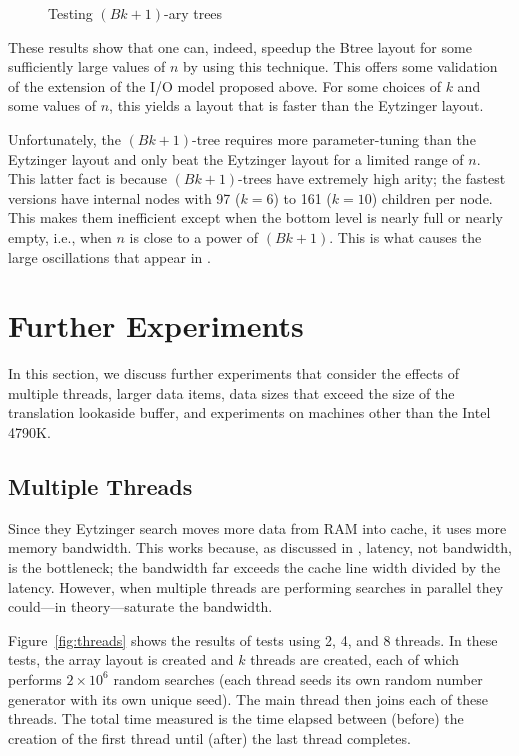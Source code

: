 \documentclass{patmorin}
\begin{document}
\begin{figure}
   \caption{Testing $(Bk+1)$-ary trees}
\end{figure}

These results show that one can, indeed, speedup the Btree layout for
some sufficiently large values of $n$ by using this technique.  This offers
some validation of the extension of the I/O model proposed above.
For some choices of $k$ and some values of $n$, this yields a layout
that is faster than the Eytzinger layout. 

Unfortunately, the $(Bk+1)$-tree requires more parameter-tuning than the
Eytzinger layout and only beat the Eytzinger layout for a limited range
of $n$.  This latter fact is because $(Bk+1)$-trees have extremely high
arity; the fastest versions have internal nodes with 97 ($k=6$) to 161
($k=10$) children per node. This makes them inefficient except when the
bottom level is nearly full or nearly empty, i.e., when $n$ is close to
a power of $(Bk+1)$.  This is what causes the large oscillations that
appear in .

\section{Further Experiments}

In this section, we discuss further experiments that consider the effects
of multiple threads, larger data items, data sizes that exceed the size
of the translation lookaside buffer, and experiments on machines other
than the Intel 4790K.

\subsection{Multiple Threads}

Since they Eytzinger search moves more data from RAM into cache,
it uses more memory bandwidth.  This works because, as discussed in
, latency, not bandwidth, is the bottleneck; the
bandwidth far exceeds the cache line width divided by the latency.
However, when multiple threads are performing searches in parallel they
could---in theory---saturate the bandwidth.

Figure~\ref{fig:threads} shows the results of tests
using 2, 4, and 8 threads.  In these tests, the array layout is created
and $k$ threads are created, each of which performs $2\times 10^6$
random searches (each thread seeds its own random number generator
with its own unique seed).  The main thread then joins each of these
threads. The total time measured is the time elapsed between (before)
the creation of the first thread until (after) the last thread completes.
\end{document}
